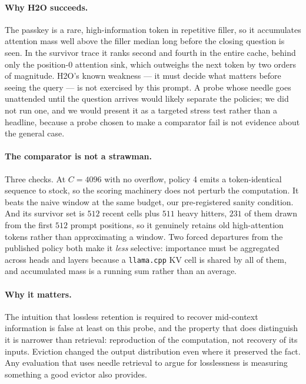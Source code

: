 \documentclass[manuscript,anonymous,review]{acmart}
\begin{document}
\paragraph{Why H2O succeeds.} The passkey is a rare, high-information
token in repetitive filler, so it accumulates attention mass well above
the filler median long before the closing question is seen. In the
survivor trace it ranks second and fourth in the entire cache, behind
only the position-0 attention sink, which outweighs the next token by
two orders of magnitude. H2O's known weakness --- it must decide what
matters before seeing the query --- is not exercised by this prompt. A
probe whose needle goes unattended until the question arrives would
likely separate the policies; we did not run one, and we would present
it as a targeted stress test rather than a headline, because a probe
chosen to make a comparator fail is not evidence about the general
case.

\paragraph{The comparator is not a strawman.} Three checks. At
$C = 4096$ with no overflow, policy 4 emits a token-identical sequence
to stock, so the scoring machinery does not perturb the computation. It
beats the naive window at the same budget, our pre-registered sanity
condition. And its survivor set is $512$ recent cells plus $511$ heavy
hitters, $231$ of them drawn from the first $512$ prompt positions, so
it genuinely retains old high-attention tokens rather than
approximating a window. Two forced departures from the published
policy both make it \emph{less} selective: importance must be
aggregated across heads and layers because a \texttt{llama.cpp} KV cell
is shared by all of them, and accumulated mass is a running sum rather
than an average.

\paragraph{Why it matters.} The intuition that lossless retention is
required to recover mid-context information is false at least on this
probe, and the property that does distinguish it is narrower than
retrieval: reproduction of the computation, not recovery of its inputs.
Eviction changed the output distribution even where it preserved the
fact. Any evaluation that uses needle retrieval to argue for
losslessness is measuring something a good evictor also provides.
\end{document}
